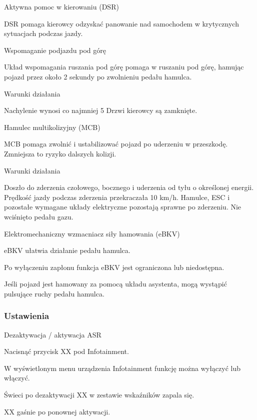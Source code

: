 Aktywna pomoc w kierowaniu (DSR)

DSR pomaga kierowcy odzyskać panowanie nad samochodem w krytycznych sytuacjach podczas jazdy.

Wspomaganie podjazdu pod górę

Układ wspomagania ruszania pod górę pomaga w ruszaniu pod górę, hamując pojazd przez około 2 sekundy po zwolnieniu pedału hamulca.

Warunki działania
\begin{itemizeTick}
	\itemTick Nachylenie wynosi co najmniej 5%
	\itemTick Drzwi kierowcy są zamknięte.
\end{itemizeTick}

Hamulec multikolizyjny (MCB)

MCB pomaga zwolnić i ustabilizować pojazd po uderzeniu w przeszkodę. Zmniejsza to ryzyko dalszych kolizji.

Warunki działania
\begin{itemizeTick}
	\itemTick Doszło do zderzenia czołowego, bocznego i uderzenia od tyłu o określonej energii.
	\itemTick Prędkość jazdy podczas zderzenia przekraczała 10 km/h.
	\itemTick Hamulce, ESC i pozostałe wymagane układy elektryczne pozostają sprawne po zderzeniu.
	\itemTick Nie wciśnięto pedału gazu.
\end{itemizeTick}

Elektromechaniczny wzmacniacz siły hamowania (eBKV)

eBKV ułatwia działanie pedału hamulca.

Po wyłączeniu zapłonu funkcja eBKV jest ograniczona lub niedostępna.

Jeśli pojazd jest hamowany za pomocą układu asystenta, mogą wystąpić pulsujące ruchy pedału hamulca.


\subsubsection{Ustawienia}

Dezaktywacja / aktywacja ASR
\begin{itemizeArrow}
	\itemArrow Nacisnąć przycisk XX pod Infotainment.
\end{itemizeArrow}

W wyświetlonym menu urządzenia Infotainment
funkcję można wyłączyć lub włączyć.

Świeci po dezaktywacji XX w zestawie wskaźników zapala się.

XX gaśnie po ponownej aktywacji.


